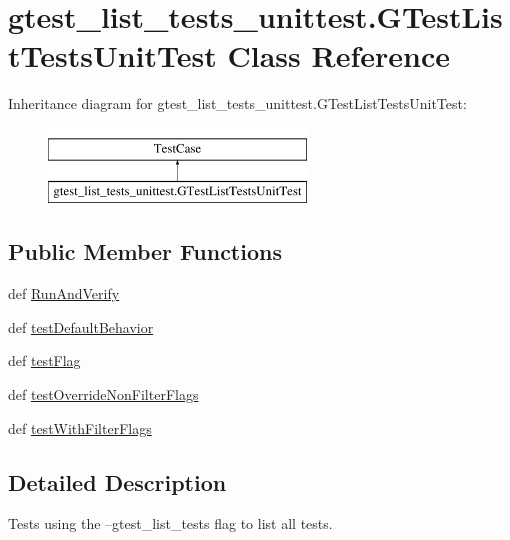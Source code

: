 \hypertarget{classgtest__list__tests__unittest_1_1_g_test_list_tests_unit_test}{\section{gtest\-\_\-list\-\_\-tests\-\_\-unittest.\-G\-Test\-List\-Tests\-Unit\-Test Class Reference}
\label{classgtest__list__tests__unittest_1_1_g_test_list_tests_unit_test}
}
Inheritance diagram for gtest\-\_\-list\-\_\-tests\-\_\-unittest.\-G\-Test\-List\-Tests\-Unit\-Test\-:\begin{figure}[H]
\begin{center}
\leavevmode
\includegraphics[height=2.000000cm]{classgtest__list__tests__unittest_1_1_g_test_list_tests_unit_test}
\end{center}
\end{figure}
\subsection*{Public Member Functions}
\begin{DoxyCompactItemize}
\item 
def \hyperlink{classgtest__list__tests__unittest_1_1_g_test_list_tests_unit_test_a40e77e7c5403572e217800ece017e23c}{Run\-And\-Verify}
\item 
def \hyperlink{classgtest__list__tests__unittest_1_1_g_test_list_tests_unit_test_aac9309ee49861b5e236b01c09b627aaa}{test\-Default\-Behavior}
\item 
def \hyperlink{classgtest__list__tests__unittest_1_1_g_test_list_tests_unit_test_a707861fc7af9705f23055c035f62eb0a}{test\-Flag}
\item 
def \hyperlink{classgtest__list__tests__unittest_1_1_g_test_list_tests_unit_test_ad9bd5b6440f4367ce3f9c95387da2092}{test\-Override\-Non\-Filter\-Flags}
\item 
def \hyperlink{classgtest__list__tests__unittest_1_1_g_test_list_tests_unit_test_a45ae59707129ae128690d12c99f6cf51}{test\-With\-Filter\-Flags}
\end{DoxyCompactItemize}


\subsection{Detailed Description}
\begin{DoxyVerb}Tests using the --gtest_list_tests flag to list all tests.\end{DoxyVerb}
 

